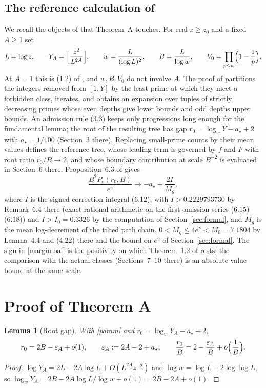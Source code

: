 \documentclass[11pt]{amsart}
\newtheorem{lemma}{Lemma}[section]
\newcommand{\Mg}{M_g}
\newcommand{\astar}{a_\star}
\newcommand{\eps}{\varepsilon}
\begin{document}
\subsection{The reference calculation of \cite{OAI}}\label{sec:ref}
We recall the objects of \cite{OAI} that Theorem~A touches. For real $z\ge z_0$ and a fixed $A\ge1$ set
\begin{equation}\label{param}
L=\log z,\qquad Y_A=\Bigl\lfloor\frac{z^2}{L^{2A}}\Bigr\rfloor,\qquad w=\frac{L}{(\log L)^2},\qquad B=\frac{L}{\log w},\qquad V_0=\prod_{p\le w}\Bigl(1-\frac1p\Bigr).
\end{equation}
At $A=1$ this is (1.2) of \cite{OAI}, and $w,B,V_0$ do not involve $A$. The proof of \cite{OAI} partitions the integers removed from $[1,Y]$ by the least prime at which they meet a forbidden class, iterates, and obtains an expansion over tuples of strictly decreasing primes whose even depths give lower bounds and odd depths upper bounds. An admission rule (3.3) keeps only progressions long enough for the fundamental lemma; the root of the resulting tree has gap $r_0=\log_wY-\astar+2$ with $\astar=1/100$ (Section~3 there). Replacing small-prime counts by their mean values defines the reference tree, whose leading term is governed by $f$ and $F$ with root ratio $r_0/B\to2$, and whose boundary contribution at scale $B^{-2}$ is evaluated in Section~6 there: Proposition~6.3 of \cite{OAI} gives
\begin{equation}\label{margin-oai}
\frac{B^2P_e(r_0,B)}{e^{\gamma}}\longrightarrow-\astar+\frac{2I}{\Mg},
\end{equation}
where $I$ is the signed correction integral (6.12), with $I>0.2229793730$ by Remark~6.4 there (exact rational arithmetic on the first-omission series (6.15)--(6.18)) and $I>I_0=0.3326$ by the computation of Section~\ref{sec:formal}, and $\Mg$ is the mean log-decrement of the tilted path chain, $0<\Mg\le4e^{\gamma}<M_0=7.1804$ by Lemma~4.4 and (4.22) there and the bound on $e^\gamma$ of Section~\ref{sec:formal}. The sign in \eqref{margin-oai} is the positivity on which Theorem~1.2 of \cite{OAI} rests; the comparison with the actual classes (Sections~7--10 there) is an absolute-value bound at the same scale.

\section{Proof of Theorem A}\label{sec:thmA}

\begin{lemma}[Root gap]\label{root}
With \eqref{param} and $r_0=\log_wY_A-\astar+2$,
\[
r_0=2B-\eps_A+o(1),\qquad\eps_A:=2A-2+\astar,\qquad\frac{r_0}{B}=2-\frac{\eps_A}{B}+o\Bigl(\frac1B\Bigr).
\]
\end{lemma}
\begin{proof}
$\log Y_A=2L-2A\log L+O(L^{2A}z^{-2})$ and $\log w=\log L-2\log\log L$, so $\log_wY_A=2B-2A\log L/\log w+o(1)=2B-2A+o(1)$.
\end{proof}
\end{document}
